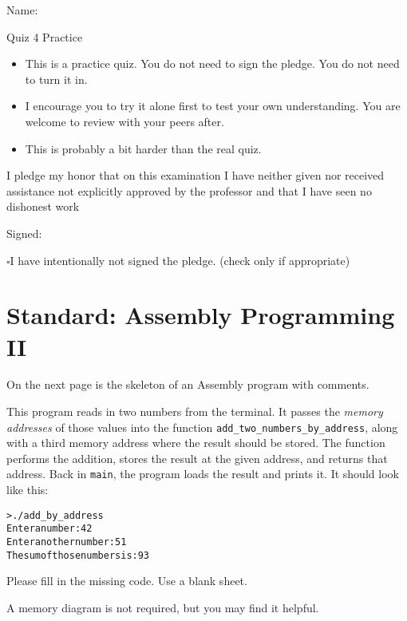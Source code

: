 \documentclass[12pt]{article}
\begin{document}
Name: \makebox[3in]{\hrulefill}

\vfill

\begin{center}
{\huge Quiz 4 Practice}
\end{center}

\begin{itemize}
    \item This is a practice quiz. You do not need to sign the pledge. You do not need to turn it in. 
    \item I encourage you to try it alone first to test your own understanding. You are welcome to review with your peers after.
    \item This is probably a bit harder than the real quiz.
\end{itemize}

\vfill

I pledge my honor that on this examination I have neither given nor received assistance not explicitly approved by the professor and that I have seen no dishonest work 

\hfill Signed: \makebox[3in]{\hrulefill}

$\square$\quad I have intentionally not signed the pledge. (check only if appropriate)
\newpage

\section*{Standard: Assembly Programming II}

On the next page is the skeleton of an Assembly program with comments. 

This program reads in two numbers from the terminal. It passes the \textit{memory addresses} of those values into the function \texttt{add\_two\_numbers\_by\_address}, along with a third memory address where the result should be stored. The function performs the addition, stores the result at the given address, and returns that address. Back in \texttt{main}, the program loads the result and prints it. It should look like this:

\begin{alltt}
    > ./add_by_address
    Enter a number: 42
    Enter another number: 51
    The sum of those numbers is: 93
\end{alltt}

Please fill in the missing code. Use a blank sheet.

A memory diagram is not required, but you may find it helpful.
\end{document}
